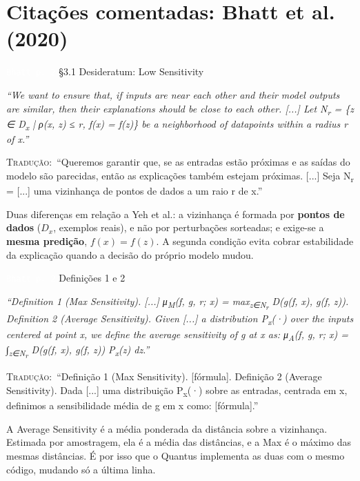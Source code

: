 \documentclass[11pt,a4paper]{article}
\newcommand{\pagechip}[1]{{\setlength{\fboxsep}{1.5pt}\colorbox{cAcc}{\textcolor{white}{\scriptsize\texttt{#1}}}}}
\newenvironment{origquote}{\par\itshape\small}{\par}
\newenvironment{tradquote}{\par\small\textsc{Tradução:}\ }{\par}
\newcommand{\explab}[1]{\par\smallskip{\small\color{cAcc}\textbf{\MakeUppercase{#1}}}\par}
\begin{document}
\section{Citações comentadas: Bhatt et al. (2020)}

\begin{citacard}{\pagechip{Bhatt p. 2} §3.1 Desideratum: Low Sensitivity}
\begin{origquote}“We want to ensure that, if inputs are near each other and their model outputs are similar, then their explanations should be close to each other. [...] Let N\textsubscript{r} = \{z ∈ D\textsubscript{x} | ρ(x, z) ≤ r, f(x) = f(z)\} be a neighborhood of datapoints within a radius r of x.”\end{origquote}
\begin{tradquote}“Queremos garantir que, se as entradas estão próximas e as saídas do modelo são parecidas, então as explicações também estejam próximas. [...] Seja N\textsubscript{r} = [...] uma vizinhança de pontos de dados a um raio r de x.”\end{tradquote}
\explab{Explicação}
Duas diferenças em relação a Yeh et al.: a vizinhança é formada por \textbf{pontos de dados} ($D_x$, exemplos reais), e não por perturbações sorteadas; e exige-se a \textbf{mesma predição}, $f(x) = f(z)$. A segunda condição evita cobrar estabilidade da explicação quando a decisão do próprio modelo mudou.
\end{citacard}

\begin{citacard}{\pagechip{Bhatt p. 2} Definições 1 e 2}
\begin{origquote}“Definition 1 (Max Sensitivity). [...] μ\textsubscript{M}(f, g, r; x) = max\textsubscript{z∈N\textsubscript{r}} D(g(f, x), g(f, z)). Definition 2 (Average Sensitivity). Given [...] a distribution P\textsubscript{x}(·) over the inputs centered at point x, we define the average sensitivity of g at x as: μ\textsubscript{A}(f, g, r; x) = ∫\textsubscript{z∈N\textsubscript{r}} D(g(f, x), g(f, z)) P\textsubscript{x}(z) dz.”\end{origquote}
\begin{tradquote}“Definição 1 (Max Sensitivity). [fórmula]. Definição 2 (Average Sensitivity). Dada [...] uma distribuição P\textsubscript{x}(·) sobre as entradas, centrada em x, definimos a sensibilidade média de g em x como: [fórmula].”\end{tradquote}
\explab{Explicação}
A Average Sensitivity é a média ponderada da distância sobre a vizinhança. Estimada por amostragem, ela é a média das distâncias, e a Max é o máximo das mesmas distâncias. É por isso que o Quantus implementa as duas com o mesmo código, mudando só a última linha.
\end{citacard}
\end{document}
